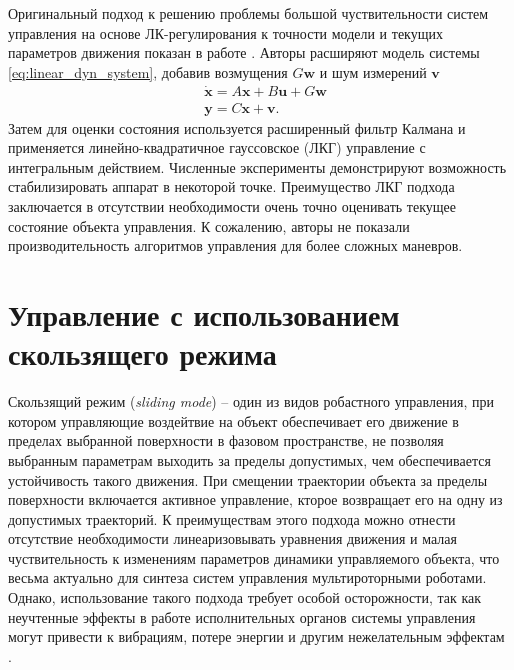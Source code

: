 Оригинальный подход к решению проблемы большой чуствительности систем управления на основе ЛК-регулирования к точности модели и текущих параметров движения показан в работе \cite{Minh01}. Авторы расширяют модель системы \eqref{eq:linear_dyn_system}, добавив возмущения $G \bm{w}$ и шум измерений $\bm{v}$
\begin{equation} \label{eq:linear_dyn_system_noisy}
\begin{aligned}
&\dot{\bm{x}} = A\bm{x} + B\bm{u} + G \bm{w}\\
&\bm{y} = C \bm{x} + \bm{v}.
\end{aligned}
\end{equation}
Затем для оценки состояния используется расширенный фильтр Калмана и применяется линейно-квадратичное гауссовское (ЛКГ) управление с интегральным действием. Численные эксперименты демонстрируют возможность стабилизировать аппарат в некоторой точке. Преимущество ЛКГ подхода заключается в отсутствии необходимости очень точно оценивать текущее состояние объекта управления. К сожалению, авторы не показали производительность алгоритмов управления для более сложных маневров.

\section{Управление с использованием скользящего режима}

Скользящий режим (\textit{sliding mode}) -- один из видов робастного управления, при котором управляющие воздейтвие на объект обеспечивает его движение в пределах выбранной поверхности в фазовом пространстве, не позволяя выбранным параметрам выходить за пределы допустимых, чем обеспечивается устойчивость такого движения.
При смещении траектории объекта за пределы поверхности включается активное управление, кторое возвращает его на одну из допустимых траекторий.
К преимуществам этого подхода можно отнести отсутствие необходимости линеаризовывать уравнения движения и малая чуствительность к изменениям параметров динамики управляемого объекта, что весьма актуально для синтеза систем управления мультироторными роботами.
Однако, использование такого подхода требует особой осторожности, так как неучтенные эффекты в работе исполнительных органов системы управления могут привести к вибрациям, потере энергии и другим нежелательным эффектам \cite{Utkin01}.

